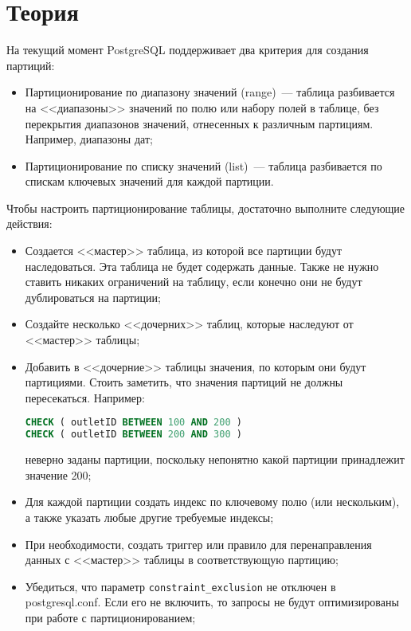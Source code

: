 \section{Теория}

На текущий момент PostgreSQL поддерживает два критерия для создания партиций:

\begin{itemize}
  \item Партиционирование по диапазону значений (range)~--- таблица разбивается на <<диапазоны>> значений по полю или набору полей в таблице, без перекрытия диапазонов значений, отнесенных к различным партициям. Например, диапазоны дат;
  \item Партиционирование по списку значений (list)~--- таблица разбивается по спискам ключевых значений для каждой партиции.
\end{itemize}

Чтобы настроить партиционирование таблицы, достаточно выполните следующие действия:

\begin{itemize}
  \item Создается <<мастер>> таблица, из которой все партиции будут наследоваться. Эта таблица не будет содержать данные. Также не нужно ставить никаких ограничений на таблицу, если конечно они не будут дублироваться на партиции;
  \item Создайте несколько <<дочерних>> таблиц, которые наследуют от <<мастер>> таблицы;
  \item Добавить в <<дочерние>> таблицы значения, по которым они будут партициями. Стоить заметить, что значения партиций не должны пересекаться. Например:

\begin{lstlisting}[language=SQL,label=lst:partitioning1,caption=Пример неверного задания значений партиций]
CHECK ( outletID BETWEEN 100 AND 200 )
CHECK ( outletID BETWEEN 200 AND 300 )
\end{lstlisting}

  неверно заданы партиции, поскольку непонятно какой партиции принадлежит значение 200;
  \item Для каждой партиции создать индекс по ключевому полю (или нескольким), а также указать любые другие требуемые индексы;
  \item При необходимости, создать триггер или правило для перенаправления данных с <<мастер>> таблицы в соответствующую партицию;
  \item Убедиться, что параметр \lstinline!constraint_exclusion! не отключен в postgresql.conf. Если его не включить, то запросы не будут оптимизированы при работе с партиционированием;
\end{itemize}

